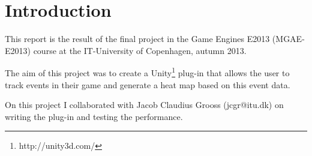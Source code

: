 \section{Introduction}
\label{Intro}
This report is the result of the final project in the Game Engines E2013 (MGAE-E2013) course at the IT-University of Copenhagen, autumn 2013. 

The aim of this project was to create a Unity\footnote{http://unity3d.com/} plug-in that allows the user to track events in their game and generate a heat map based on this event data.

On this project I collaborated with Jacob Claudius Grooss (jcgr@itu.dk) on writing the plug-in and testing the performance.
